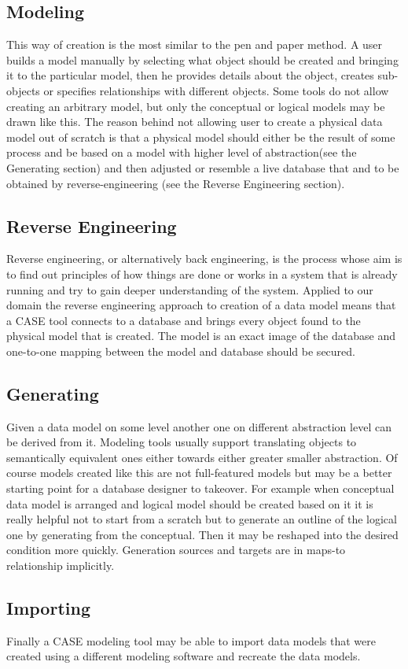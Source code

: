 \subsection{Modeling}
This way of creation is the most similar to the pen and paper method. A user builds a model manually by selecting what object should be created and bringing it to the particular model, then he provides details about the object, creates sub-objects or specifies relationships with different objects.
Some tools do not allow creating an arbitrary model, but only the conceptual or logical models may be drawn like this. 
The reason behind not allowing user to create a physical data model out of scratch is that a physical model should either be the result of some process and be based on a model with higher level of abstraction(see the Generating section) and then adjusted or resemble a live database that and to be obtained by reverse-engineering (see the Reverse Engineering section).

\subsection{Reverse Engineering}
Reverse engineering, or alternatively back engineering, is the process whose aim is to find out principles of how things are done or works in a system that is already running and try to gain deeper understanding of the system.
Applied to our domain the reverse engineering approach to creation of a data model means that a CASE tool connects to a database and brings every object found to the physical model that is created.  The model is an exact image of the database and one-to-one mapping between the model and database should be secured.

\subsection{Generating}
Given a data model on some level another one on different abstraction level can be derived from it. Modeling tools usually support translating objects to semantically equivalent ones either towards either greater smaller abstraction. Of course models created like this are not full-featured models but may be a better starting point for a database designer to takeover. For example when conceptual data model is arranged and logical model should be created based on it it is really helpful not to start from a scratch but to generate an outline of the logical one by generating from the conceptual. Then it may be reshaped into the desired condition more quickly. Generation sources and targets are in maps-to relationship implicitly.

\subsection{Importing}
Finally a CASE modeling tool may be able to import data models that were created using a different modeling software and recreate the data models.